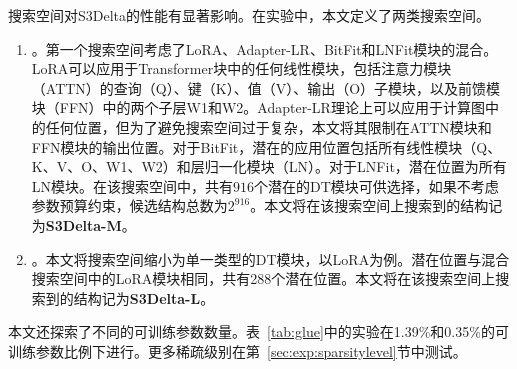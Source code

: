 搜索空间对S3Delta的性能有显著影响。在实验中，本文定义了两类搜索空间。

\begin{enumerate}
\item {}。第一个搜索空间考虑了LoRA、Adapter-LR、BitFit和LNFit模块的混合。LoRA可以应用于Transformer块中的任何线性模块，包括注意力模块（ATTN）的查询（Q）、键（K）、值（V）、输出（O）子模块，以及前馈模块（FFN）中的两个子层W1和W2。Adapter-LR理论上可以应用于计算图中的任何位置，但为了避免搜索空间过于复杂，本文将其限制在ATTN模块和FFN模块的输出位置。对于BitFit，潜在的应用位置包括所有线性模块（Q、K、V、O、W1、W2）和层归一化模块（LN）。对于LNFit，潜在位置为所有LN模块。在该搜索空间中，共有$916$个潜在的DT模块可供选择，如果不考虑参数预算约束，候选结构总数为$2^{916}$。本文将在该搜索空间上搜索到的结构记为\textbf{S3Delta-M}。

\item {}。本文将搜索空间缩小为单一类型的DT模块，以LoRA为例。潜在位置与混合搜索空间中的LoRA模块相同，共有288个潜在位置。本文将在该搜索空间上搜索到的结构记为\textbf{S3Delta-L}。

\end{enumerate}

本文还探索了不同的可训练参数数量。表~\ref{tab:glue}中的实验在1.39\%和0.35\%的可训练参数比例下进行。更多稀疏级别在第~\ref{sec:exp:sparsitylevel}节中测试。




\newcommand{\femph}[1]{\cellcolor[HTML]{C5E0B4}{#1}}
\newcommand{\semph}[1]{\cellcolor[HTML]{CFE2F3}{#1}}

\newcommand{\crect}[1]{{\begin{tikzpicture}
\node[rectangle,
    draw = themeyellow,
    fill = themedarkyellow,
    inner sep=0pt,
    line width = 0.03cm,
    minimum width = #1 cm, 
    minimum height = 0.25 cm] at (0,0) {};
\end{tikzpicture}} 
}

